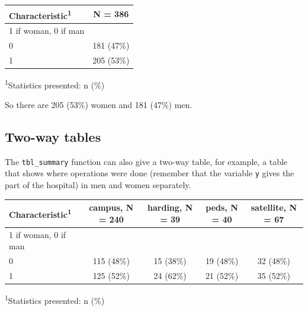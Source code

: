 \documentclass[]{book}
\newenvironment{Shaded}{\begin{snugshade}}{\end{snugshade}}
\newcommand{\CommentTok}[1]{\textcolor[rgb]{0.56,0.35,0.01}{\textit{#1}}}
\newcommand{\DataTypeTok}[1]{\textcolor[rgb]{0.13,0.29,0.53}{#1}}
\newcommand{\KeywordTok}[1]{\textcolor[rgb]{0.13,0.29,0.53}{\textbf{#1}}}
\newcommand{\NormalTok}[1]{#1}
\newcommand{\OperatorTok}[1]{\textcolor[rgb]{0.81,0.36,0.00}{\textbf{#1}}}
\newcommand{\StringTok}[1]{\textcolor[rgb]{0.31,0.60,0.02}{#1}}
\begin{document}
\captionsetup[table]{labelformat=empty,skip=1pt}
\begin{longtable}{lc}
\toprule
\textbf{Characteristic}\textsuperscript{1} & \textbf{N = 386} \\ 
\midrule
1 if woman, 0 if man &  \\ 
0 & 181 (47\%) \\ 
1 & 205 (53\%) \\ 
\bottomrule
\end{longtable}
\vspace{-5mm}
\begin{minipage}{\linewidth}
\textsuperscript{1}Statistics presented: n (\%) \\ 
\end{minipage}

So there are 205 (53\%) women and 181 (47\%) men.

\hypertarget{two-way-tables}{%
\subsection{Two-way tables}\label{two-way-tables}}

The \texttt{tbl\_summary} function can also give a two-way table, for example, a table that shows where operations were done (remember that the variable \texttt{y} gives the part of the hospital) in men and women separately.

\begin{Shaded}
\end{Shaded}

\captionsetup[table]{labelformat=empty,skip=1pt}
\begin{longtable}{lcccc}
\toprule
\textbf{Characteristic}\textsuperscript{1} & \textbf{campus}, N = 240 & \textbf{harding}, N = 39 & \textbf{peds}, N = 40 & \textbf{satellite}, N = 67 \\ 
\midrule
1 if woman, 0 if man &  &  &  &  \\ 
0 & 115 (48\%) & 15 (38\%) & 19 (48\%) & 32 (48\%) \\ 
1 & 125 (52\%) & 24 (62\%) & 21 (52\%) & 35 (52\%) \\ 
\bottomrule
\end{longtable}
\vspace{-5mm}
\begin{minipage}{\linewidth}
\textsuperscript{1}Statistics presented: n (\%) \\ 
\end{minipage}
\end{document}
